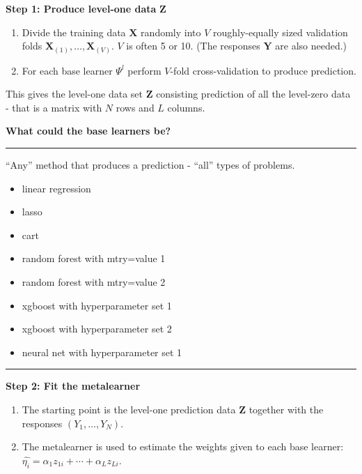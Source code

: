 \documentclass[
  letterpaper,
  DIV=11,
  numbers=noendperiod]{scrartcl}
\providecommand{\tightlist}{%
  \setlength{\itemsep}{0pt}\setlength{\parskip}{0pt}}\usepackage{longtable,booktabs,array}
\begin{document}
\textbf{Step 1: Produce level-one data} \({\boldsymbol Z}\)

\begin{enumerate}
\def\labelenumi{\alph{enumi})}
\item
  Divide the training data \({\boldsymbol X}\) randomly into \(V\)
  roughly-equally sized validation folds
  \({\boldsymbol X}_{(1)},\ldots,{\boldsymbol X}_{(V)}\). \(V\) is often
  5 or 10. (The responses \({\boldsymbol Y}\) are also needed.)
\item
  For each base learner \(\Psi^l\) perform \(V\)-fold cross-validation
  to produce prediction.
\end{enumerate}

This gives the level-one data set \({\boldsymbol Z}\) consisting
prediction of all the level-zero data - that is a matrix with \(N\) rows
and \(L\) columns.

\textbf{What could the base learners be?}

\begin{center}\rule{0.5\linewidth}{0.5pt}\end{center}

``Any'' method that produces a prediction - ``all'' types of problems.

\begin{itemize}
\tightlist
\item
  linear regression
\item
  lasso
\item
  cart
\item
  random forest with mtry=value 1
\item
  random forest with mtry=value 2
\item
  xgboost with hyperparameter set 1
\item
  xgboost with hyperparameter set 2
\item
  neural net with hyperparameter set 1
\end{itemize}

\begin{center}\rule{0.5\linewidth}{0.5pt}\end{center}

\textbf{Step 2: Fit the metalearner}

\begin{enumerate}
\def\labelenumi{\alph{enumi})}
\tightlist
\item
  The starting point is the level-one prediction data
  \({\boldsymbol Z}\) together with the responses \((Y_1,\ldots ,Y_N)\).
\item
  The metalearner is used to estimate the weights given to each base
  learner: \(\hat{\eta_i}=\alpha_1 z_{1i}+ \cdots + \alpha_L z_{Li}\).
\end{enumerate}
\end{document}
